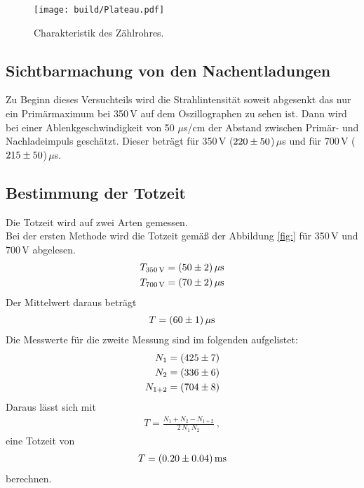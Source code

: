 \begin{figure}[H]
  \centering
  \texttt{[image: build/Plateau.pdf]}
  \caption{Charakteristik des Zählrohres.}
  \label{fig:Char1}
\end{figure}


\subsection{Sichtbarmachung von den Nachentladungen}
Zu Beginn dieses Versuchteils wird die Strahlintensität soweit abgesenkt das nur ein Primärmaximum bei 350\,V auf dem Oszillographen zu sehen ist. Dann wird bei einer Ablenkgeschwindigkeit von 50 $\mu$s/cm der Abstand zwischen Primär- und Nachladeimpuls geschätzt. Dieser beträgt für 350\,V ($\num{220 +- 50}$)\,$\mu$s und für 700\,V ($\num{215 +- 50}$)\,$\mu$s.


\subsection{Bestimmung der Totzeit}
Die Totzeit wird auf zwei Arten gemessen. \\
Bei der ersten Methode wird die Totzeit gemäß der Abbildung \eqref{fig:} für 350\,V und 700\,V abgelesen.
\begin{align*}
  T_\text{350\,V} = (\num{50 +- 2})\,\mu\text{s} \\
  T_\text{700\,V} = (\num{70 +- 2})\,\mu\text{s} \\
\end{align*}
Der Mittelwert daraus beträgt
\begin{align*}
  T = (\num{60 +- 1})\,\mu\text{s}
\end{align*}
Die Messwerte für die zweite Messung sind im folgenden aufgelistet:
\begin{align*}
  N_1 = (\num{425 +- 7}) \\
  N_2 = (\num{336 +- 6}) \\
  N_{1+2} = (\num{704 +- 8}) \\
\end{align*}
Daraus lässt sich mit
\begin{align*}
  T = \frac{N_1 + N_2 - N_{1+2}}{2\,N_1\,N_2} \ ,
\end{align*}
eine Totzeit von
\begin{align*}
  T = (\num{0.20 +- 0.04})\,\text{ms}
\end{align*}
berechnen.

























\subsection{}
